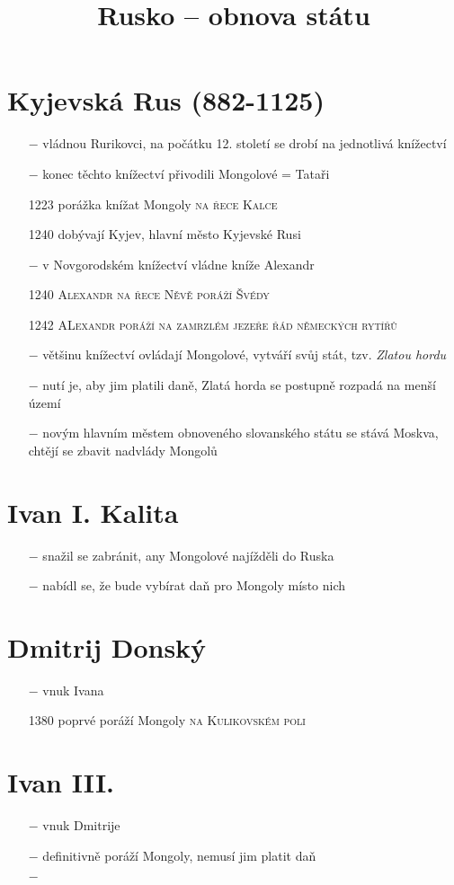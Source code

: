 \documentclass{article}
\title{\vspace{-2cm}Rusko -- obnova státu \vspace{-1.7cm}}
\date{}
\author{}
\begin{document}
\maketitle

\section*{Kyjevská Rus (882-1125)}
\begin{itemize}
    \vspace{-0.5em}
    \setlength\itemsep{0.15em}
    \item[$-$] vládnou Rurikovci, na počátku 12. století se drobí na jednotlivá knížectví
    \item[$-$] konec těchto knížectví přivodili Mongolové = Tataři
    \item[1223] porážka knížat Mongoly \textsc{na řece Kalce}
    \item[1240] dobývají Kyjev, hlavní město Kyjevské Rusi
    \item[$-$] v Novgorodském knížectví vládne kníže Alexandr
    \item[1240] \textsc{Alexandr na řece Něvě poráží Švédy}
    \item[1242]  \textsc{ALexandr poráží na zamrzlém jezeře řád německých rytířů}
    \item[$-$] většinu knížectví ovládají Mongolové, vytváří svůj stát, tzv. \textit{Zlatou hordu}
    \item[$-$] nutí je, aby jim platili daně, Zlatá horda se postupně rozpadá na menší území
    \item[$-$] novým hlavním městem obnoveného slovanského státu se stává Moskva, chtějí se zbavit nadvlády Mongolů
\end{itemize}


\section*{Ivan I. Kalita}
\begin{itemize}
    \vspace{-0.5em}
    \setlength\itemsep{0.15em}
    \item[$-$] snažil se zabránit, any Mongolové najížděli do Ruska
    \item[$-$] nabídl se, že bude vybírat daň pro Mongoly místo nich
\end{itemize}


\section*{Dmitrij Donský}
\begin{itemize}
    \vspace{-0.5em}
    \setlength\itemsep{0.15em}
    \item[$-$] vnuk Ivana
    \item[1380] poprvé poráží Mongoly \textsc{na Kulikovském poli}
\end{itemize}


\section*{Ivan III.}
\begin{itemize}
    \vspace{-0.5em}
    \setlength\itemsep{0.15em}
    \item[$-$] vnuk Dmitrije
    \item[$-$] definitivně poráží Mongoly, nemusí jim platit daň
    \item[$-$]
\end{itemize}
\end{document}
